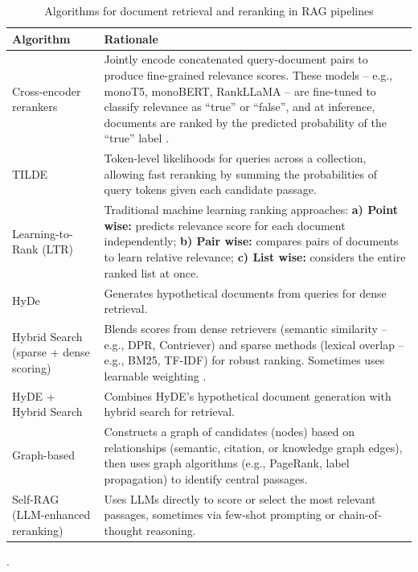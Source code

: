 \begin{spacing}{1.5}
\addtocounter{table}{-1}
\begin{table}[H]
\centering
\footnotesize
\begin{tabularx}{\textwidth}{l X}
\toprule
\textbf{Algorithm} & \textbf{Rationale} \\
\midrule
Cross-encoder rerankers & Jointly encode concatenated query-document pairs to produce fine-grained relevance scores. These models -- e.g., monoT5, monoBERT, RankLLaMA -- are fine-tuned to classify relevance as ``true'' or ``false'', and at inference, documents are ranked by the predicted probability of the ``true'' label \citep{wang_searching_2024}. \\
\cmidrule(lr){1-2}
TILDE \citep{zhuang_tilde_2021} & Token-level likelihoods for queries across a collection, allowing fast reranking by summing the probabilities of query tokens given each candidate passage. \\
\cmidrule(lr){1-2}
Learning-to-Rank (LTR) \citep{gupta_comprehensive_2024} & Traditional machine learning ranking approaches: \textbf{a) Point wise:} predicts relevance score for each document independently; \textbf{b) Pair wise:} compares pairs of documents to learn relative relevance; \textbf{c) List wise:} considers the entire ranked list at once.\\
\cmidrule(lr){1-2}
HyDe \citep{gao_precise_2022}  & Generates hypothetical documents from queries for dense retrieval.\\
\cmidrule(lr){1-2}
Hybrid Search (sparse + dense scoring) & Blends scores from dense retrievers (semantic similarity -- e.g., DPR, Contriever) and sparse methods (lexical overlap -- e.g., BM25, TF-IDF) for robust ranking. Sometimes uses learnable weighting \citep{wang_searching_2024}. \\
\cmidrule(lr){1-2}
HyDE + Hybrid Search \citep{wang_searching_2024} & Combines HyDE's hypothetical document generation with hybrid search for retrieval. \\
\cmidrule(lr){1-2}
Graph-based \citep{han_retrieval-augmented_2025} & Constructs a graph of candidates (nodes) based on relationships (semantic, citation, or knowledge graph edges), then uses graph algorithms  (e.g., PageRank, label propagation) to identify central passages. \\
\cmidrule(lr){1-2}
Self-RAG (LLM-enhanced reranking) \citep{asai_self-rag_2023} & Uses LLMs directly to score or select the most relevant passages, sometimes via few-shot prompting or chain-of-thought reasoning. \\
\bottomrule
\end{tabularx}
\vspace{0.5em}
\caption{Algorithms for document retrieval and reranking in RAG pipelines}.
\label{tab:rerank_algorithms}
\end{table}




\end{spacing}
